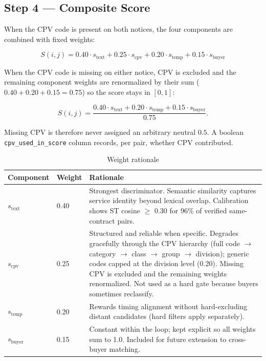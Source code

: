 \documentclass[12pt, a4paper]{article}
\begin{document}
\subsection{Step 4 --- Composite Score}
\label{sec:composite}

When the CPV code is present on both notices, the four components are combined
with fixed weights:

\begin{equation}
  \boxed{
    S(i,j) =
    0.40\cdot s_{\text{text}} +
    0.25\cdot s_{\text{cpv}} +
    0.20\cdot s_{\text{temp}} +
    0.15\cdot s_{\text{buyer}}
  }
\end{equation}

When the CPV code is missing on either notice, CPV is excluded and the remaining
component weights are renormalized by their sum
($0.40+0.20+0.15 = 0.75$) so the score stays in $[0,1]$:

\begin{equation}
  S(i,j) =
  \frac{0.40\cdot s_{\text{text}} + 0.20\cdot s_{\text{temp}} + 0.15\cdot s_{\text{buyer}}}{0.75}.
\end{equation}

Missing CPV is therefore never assigned an arbitrary neutral $0.5$. A boolean
\nolinkurl{cpv_used_in_score} column records, per pair, whether CPV contributed.

\begin{table}[h]
\centering
\caption{Weight rationale}
\begin{tabular}{@{}P{2.5cm}R{1.4cm}P{9.0cm}@{}}
\toprule
Component & Weight & Rationale \\
\midrule
$s_{\text{text}}$   & 0.40 & Strongest discriminator. Semantic similarity captures service identity beyond
                              lexical overlap. Calibration shows ST cosine $\geq$ 0.30 for 96\% of verified
                              same-contract pairs. \\[4pt]
$s_{\text{cpv}}$    & 0.25 & Structured and reliable when specific. Degrades gracefully through the CPV
                              hierarchy (full code $\to$ category $\to$ class $\to$ group $\to$ division);
                              generic codes capped at the division level (0.20). Missing CPV is excluded
                              and the remaining weights renormalized. Not used as a hard gate because
                              buyers sometimes reclassify. \\[4pt]
$s_{\text{temp}}$   & 0.20 & Rewards timing alignment without hard-excluding distant candidates
                              (hard filters apply separately). \\[4pt]
$s_{\text{buyer}}$  & 0.15 & Constant within the loop; kept explicit so all weights sum to 1.0.
                              Included for future extension to cross-buyer matching. \\
\bottomrule
\end{tabular}
\end{table}
\end{document}
